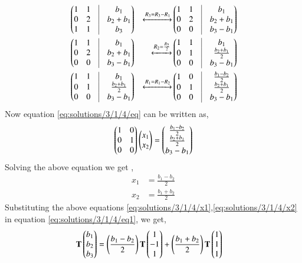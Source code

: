 \begin{align}
&\myvec{1& 1 &\vrule & b_1 \\ 0 & 2 & \vrule& b_2+b_1\\ 1 & 1 &\vrule & b_3}&\xleftrightarrow{R_3=R_3-R_1}&\myvec{1& 1 &\vrule & b_1 \\ 0 & 2 & \vrule& b_2+b_1\\ 0 & 0 &\vrule & b_3-b_1}\\
&\myvec{1& 1 &\vrule & b_1 \\ 0 & 2 & \vrule& b_2+b_1\\ 0 & 0 &\vrule & b_3-b_1}&\xleftrightarrow{R_2=\frac{R_2}{2}}&\myvec{1& 1 &\vrule & b_1 \\ 0 & 1 & \vrule& \frac{b_2+b_1}{2}\\ 0 & 0 &\vrule & b_3-b_1}\\
&\myvec{1& 1 &\vrule & b_1 \\ 0 & 1 & \vrule& \frac{b_2+b_1}{2}\\ 0 & 0 &\vrule & b_3-b_1}&\xleftrightarrow{R_1=R_1-R_2}&\myvec{1& 0 &\vrule & \frac{b_1-b_2}{2} \\ 0 & 1 & \vrule& \frac{b_2+b_1}{2}\\ 0 & 0 &\vrule & b_3-b_1}
\end{align}
Now equation \eqref{eq:solutions/3/1/4/eq} can be written as,
\begin{align}
    \begin{pmatrix}1 & 0\\0 & 1 \\ 0& 0\end{pmatrix}\begin{pmatrix}x_1\\x_2\end{pmatrix}=\begin{pmatrix}\frac{b_1-b_2}{2}\\\frac{b_2+b_1}{2}\\b_3-b_1\end{pmatrix}
\end{align}
Solving the above equation we get ,
\begin{align}
    x_1&=\frac{b_1-b_2}{2}\label{eq:solutions/3/1/4/x1}\\
    x_2&=\frac{b_1+b_2}{2}\label{eq:solutions/3/1/4/x2}
\end{align}
Substituting the above equations \eqref{eq:solutions/3/1/4/x1},\eqref{eq:solutions/3/1/4/x2} in equation \eqref{eq:solutions/3/1/4/eq1}, we get,
\begin{align}
    \mathbf{T}\begin{pmatrix}b_1\\b_2\\b_3\end{pmatrix}&=\left(\frac{b_1-b_2}{2}\right)\mathbf{T}\begin{pmatrix}1\\-1\\1\end{pmatrix}+\left(\frac{b_1+b_2}{2}\right)\mathbf{T}\begin{pmatrix}1\\1\\1\end{pmatrix}\label{eq:solutions/3/1/4/in}
\end{align}
